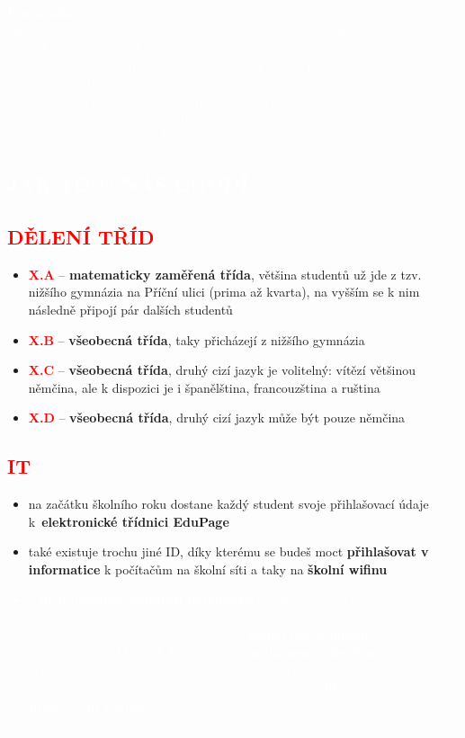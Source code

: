 \documentclass[a5paper, twoside]{article}
\newcommand{\boxik}[3]{
  \begin{tcolorbox}[
    sharp corners,
    colback = #1,
    boxrule = 0pt,
    grow to left by = 25pt,
    grow to right by = 25pt,
    right = 22pt,
    left = 22pt%
  ]
    \textcolor{#2}{#3}
  \end{tcolorbox}
}
\newcommand{\nadpis}[4]{
  \vspace*{-50pt}
  \begin{tcolorbox}[colback = #2, boxrule = 0pt, grow to left by = #4,  grow to right by = #4, arc=8pt, height = 40pt]
    \vspace*{5pt}
    \centering \section*{\textcolor{#3}{#1}}
  \end{tcolorbox}
}
\newcommand{\podnadpis}[2]{
  \subsection*{\textcolor{#2}{#1}}
}
\begin{document}
  \vfill
  \noindent\textcolor{white}{\textbf{Poznámka.} Jak si můžeš všimnout, na naší škole nemáme \textit{patra}, ale \textit{podlaží}. Ve zkratce: když vejdeš dveřmi z ulice, jsi v nultém patře (v přízemí -- tento přístup razí informatici), ale v 1. podlaží. \\
  Navíc, každé dveře mají svoje číslo. Třeba 4.A -- 310. To má svou určitou logiku: první číslice z trojice značí podlaží a další dvě značí polohu na daném podlaží tak, že 01 je nejvíc vzadu vlevo v pohledu od schodů a s každou další místností směrem doprava roste o jedna. Pokud nebudeš vědět, kde je jaká učebna, rozklikni si v rozvrhu v EduPage i její číslo a trefíš tam i poslepu!}
\newpage
{}

\nadpis{JAK TO U NÁS CHODÍ}{red}{white}{-3cm}
\noindent \podnadpis{DĚLENÍ TŘÍD}{red}
\begin{itemize}[leftmargin=10pt]
	\item \textcolor{red}{\textbf{X.A}} --  \textbf{matematicky zaměřená třída}, většina studentů už jde z tzv. nižšího gymnázia na Příční ulici (prima až kvarta), na vyšším se k nim následně připojí pár dalších studentů
	\item \textcolor{red}{\textbf{X.B}} -- \textbf{všeobecná třída}, taky přicházejí z nižšího gymnázia
	\item \textcolor{red}{\textbf{X.C}} -- \textbf{všeobecná třída}, druhý cizí jazyk je volitelný: vítězí většinou němčina, ale
	      k dispozici je i španělština, francouzština a ruština
	\item \textcolor{red}{\textbf{X.D}} -- \textbf{všeobecná třída}, druhý cizí jazyk může být pouze němčina
\end{itemize}
\podnadpis{IT}{red}
\begin{itemize}[leftmargin=10pt]
	\item na začátku školního roku dostane každý student svoje přihlašovací údaje k~\textbf{elektronické třídnici EduPage}
	\item také existuje trochu jiné ID, díky kterému se budeš moct \textbf{přihlašovat v informatice} k počítačům na školní síti a taky na \textbf{školní wifinu}
\end{itemize}

\boxik{red}{white}{\begin{itemize}[leftmargin=10pt]
    \item S \textbf{připojováním osobních notebooků} na školní wifi to bývalo v minulosti trochu složitější. Naštěstí v minulém školním roce naše zastaralá síť přošla značnými úpravami, takže už by to teď \textbf{neměl být problém}. Stačí se přihlásit na síť \textit{JAROSKA\_S} se \textbf{stejným jménem a heslem}, jako se přihlašuješ v informatice. Pokud si heslo na počítač změníš, změní se ti i heslo na wifi! V případě, že něco nebude fungovat, \textbf{zajdi za panem profesorem Blahou} (jehož kabinet si můžeš najít na plánku školy) a popros ho o pomoc.
  \end{itemize}
}
\end{document}

